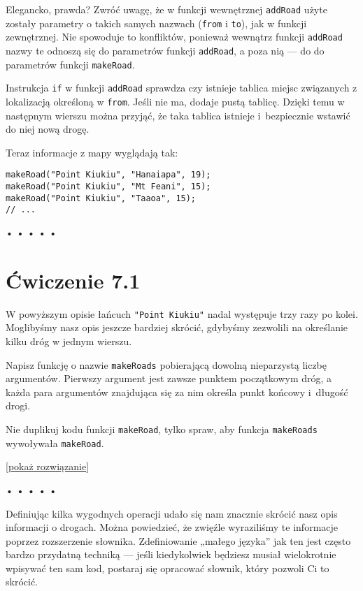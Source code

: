 Elegancko, prawda? Zwróć uwagę, że w funkcji wewnętrznej \texttt{addRoad} użyte zostały parametry o takich samych nazwach (\texttt{from} i \texttt{to}), jak w funkcji zewnętrznej. Nie spowoduje to konfliktów, ponieważ wewnątrz funkcji \texttt{addRoad} nazwy te odnoszą się do parametrów funkcji \texttt{addRoad}, a poza nią — do do parametrów funkcji \texttt{makeRoad}.

  
Instrukcja \texttt{if} w funkcji \texttt{addRoad} sprawdza czy istnieje tablica miejsc związanych z lokalizacją określoną w \texttt{from}. Jeśli nie ma, dodaje pustą tablicę. Dzięki temu w następnym wierszu można przyjąć, że taka tablica istnieje i~bezpiecznie wstawić do niej nową drogę.

  
Teraz informacje z mapy wyglądają tak:

  
\begin{verbatim} 
makeRoad("Point Kiukiu", "Hanaiapa", 19);
makeRoad("Point Kiukiu", "Mt Feani", 15);
makeRoad("Point Kiukiu", "Taaoa", 15);
// ...
 \end{verbatim}


\begin{center}
• • • • •
\end{center}

  
\section*{Ćwiczenie 7.1}
\label{sec:7.1}
  
    
W powyższym opisie łańcuch \texttt{"Point Kiukiu"} nadal występuje trzy razy po kolei. Moglibyśmy nasz opis jeszcze bardziej skrócić, gdybyśmy zezwolili na określanie kilku dróg w jednym wierszu.

    
Napisz funkcję o nazwie \texttt{makeRoads} pobierającą dowolną nieparzystą liczbę argumentów. Pierwszy argument jest zawsze punktem początkowym dróg, a każda para argumentów znajdująca się za nim określa punkt końcowy i~długość drogi.

    
Nie duplikuj kodu funkcji \texttt{makeRoad}, tylko spraw, aby funkcja \texttt{makeRoads} wywoływała \texttt{makeRoad}.

  
[\hyperref[sol:7.1]{pokaż rozwiązanie}]
  


\begin{center}
• • • • •
\end{center}

  
Definiując kilka wygodnych operacji udało się nam znacznie skrócić nasz opis informacji o drogach. Można powiedzieć, że zwięźle wyraziliśmy te informacje poprzez rozszerzenie słownika. Zdefiniowanie „małego języka” jak ten jest często bardzo przydatną techniką — jeśli kiedykolwiek będziesz musiał wielokrotnie wpisywać ten sam kod,  postaraj się opracować słownik, który pozwoli Ci to skrócić.

